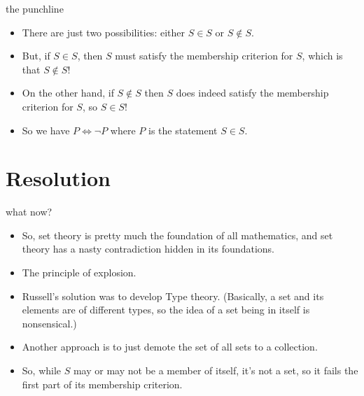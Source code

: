 \documentclass[handout,landscape]{beamer}
\begin{document}
\begin{frame}{the punchline}
\begin{itemize}
\item There are just two possibilities: either $S \in S$ or $S \notin S$. \pause
\item But, if $S \in S$, then $S$ must satisfy the membership criterion for $S$, which is that $S \notin S$! \pause
\item On the other hand, if $S \notin S$ then $S$ does indeed satisfy the membership criterion for $S$, so $S \in S$! \pause
\item So we have $P \iff \lnot P$ where $P$ is the statement $S \in S$.

\end{itemize}
\end{frame}

\section{Resolution}

\begin{frame}{what now?}
\begin{itemize}
\item So, set theory is pretty much the foundation of all mathematics, and set theory has a nasty contradiction hidden in its foundations. \pause
\item The principle of explosion. \pause
\item Russell's solution was to develop Type theory.  \pause (Basically, a set and its elements are of different types, so the idea of a set being in itself is nonsensical.) \pause
\item Another approach is to just demote the set of all sets to a collection. \pause
\item So, while $S$ may or may not be a member of itself, it's not a set, so it fails the first part of its membership criterion.

\end{itemize}
\end{frame}
\end{document}
